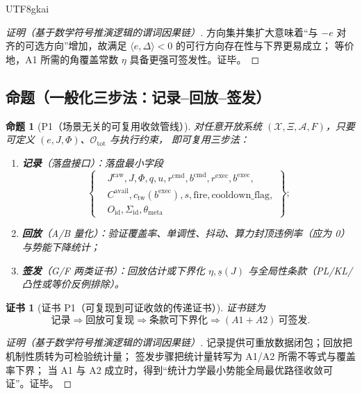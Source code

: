 \documentclass[12pt]{article}
\newtheorem{proposition}{命题}[section]
\newtheorem{Certificate}{证书}[section]
\begin{document}
\begin{CJK*}{UTF8}{gkai}
\begin{proof}[证明（基于数学符号推演逻辑的谓词因果链）]
方向集并集扩大意味着“与 $-e$ 对齐的可选方向”增加，故满足
$\langle e,\Delta\rangle<0$ 的可行方向存在性与下界更易成立；
等价地，A1 所需的角覆盖常数 $\eta$ 具备更强可签发性。证毕。
\end{proof}

\subsection{命题（一般化三步法：记录--回放--签发）}
\label{subsec:tex28-ch14-props}

\begin{proposition}[P1（场景无关的可复用收敛管线）]
\label{prop:tex28-ch14-p1}
对任意开放系统 $(\mathcal X,\Xi,\mathcal A,F)$，只要可定义 $(e,J,\Phi)$、$\mathcal O_{\mathrm{tot}}$ 与执行约束，
即可复用三步法：
\begin{enumerate}
  \item \textbf{记录}（落盘接口）：落盘最小字段
  \[
    \left\{
    \begin{aligned}
      &J^{\mathrm{raw}},J,\Phi,q,u,r^{\mathrm{cmd}},b^{\mathrm{cmd}},r^{\mathrm{exec}},b^{\mathrm{exec}},\\
      &C^{\mathrm{avail}},c_{\mathrm{tw}}(b^{\mathrm{exec}}),s,\mathrm{fire},\mathrm{cooldown\_flag},\\
      &O_{\mathrm{id}},\Sigma_{\mathrm{id}},\theta_{\mathrm{meta}}
    \end{aligned}
    \right\};
  \]
  \item \textbf{回放}（A/B 量化）：验证覆盖率、单调性、抖动、算力封顶违例率（应为 0）与势能下降统计；
  \item \textbf{签发}（G/F 两类证书）：回放估计或下界化
  $\eta,\underline s(J)$ 与全局性条款（PL/KL/凸性或等价反例排除）。
\end{enumerate}
\end{proposition}

\begin{Certificate}[证书 P1（可复现到可证收敛的传递证书）]
\label{cert:tex28-ch14-p1}
证书链为
\[
  \text{记录}
  \Rightarrow
  \text{回放可复现}
  \Rightarrow
  \text{条款可下界化}
  \Rightarrow
  (A1+A2)\ \text{可签发}.
\]
\end{Certificate}

\begin{proof}[证明（基于数学符号推演逻辑的谓词因果链）]
记录提供可重放数据闭包；回放把机制性质转为可检验统计量；
签发步骤把统计量转写为 A1/A2 所需不等式与覆盖率下界；
当 A1 与 A2 成立时，得到“统计力学最小势能全局最优路径收敛可证”。证毕。
\end{proof}


\end{CJK*}
\end{document}
